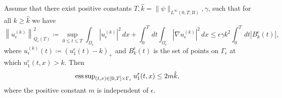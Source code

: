 \begin{theorem} Assume that there exist positive constants $T, \hat{k}=\|\psi\|_{L^{\infty}(0, T ; B)}, \gamma$, such that for all $k \geq \hat{k}$ we have
\begin{equation}
    \left\|u_{\epsilon}^{(k)}\right\|_{Q_{\epsilon}(T)}^{2}\coloneqq \sup _{0 \leq t \leq T} \int_{\Omega_{\epsilon}}\left|u_{\epsilon}^{(k)}\right|^{2} \, dx+\int_{0}^{T} \, dt \int_{\Omega_{\epsilon}}\left|\nabla u_{\epsilon}^{(k)}\right|^{2} \, dx \leq \epsilon \gamma k^{2} \int_{0}^{T} \, dt\left|B_{k}^{\epsilon}(t)\right|,
\label{eq 25}\end{equation}
where $u_{\epsilon}^{(k)}(t)\coloneqq \left(u_{1}^{\epsilon}(t)-k\right)_{+}$ and $B_{k}^{\epsilon}(t)$ is the set of points on $\Gamma_{\epsilon}$ at which $u_{1}^{\epsilon}(t, x)>k$.
Then
\begin{equation}
    \operatorname{\operatorname*{ess\,sup} }_{(t, x) \in[0, T] \times \Gamma_{\varepsilon}} u_{1}^{\varepsilon}(t, x) \leq 2 m \hat{k},
\label{eq 26}
\end{equation}
where the positive constant $m$ is independent of $\epsilon$.
\label{theorem 5.2}
\end{theorem}

